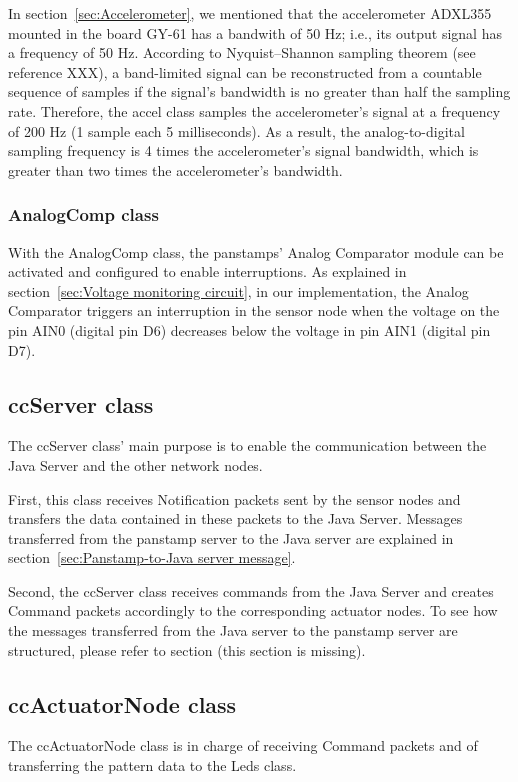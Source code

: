In section~\ref{sec:Accelerometer}, we mentioned that the accelerometer ADXL355 mounted in the board GY-61 has a bandwith of 50 Hz; i.e., its output signal has a frequency of 50 Hz. According to Nyquist–Shannon sampling theorem (see reference XXX), a band-limited signal can be reconstructed from a countable sequence of samples if the signal's bandwidth is no greater than half the sampling rate. Therefore, the accel class samples the accelerometer's signal at a frequency of 200 Hz (1 sample each 5 milliseconds). As a result, the analog-to-digital sampling frequency is 4 times the accelerometer's signal bandwidth, which is greater than two times the accelerometer's bandwidth. 

\subsubsection{AnalogComp class}
With the AnalogComp class, the panstamps' Analog Comparator module can be activated and configured to enable interruptions. As explained in section~\ref{sec:Voltage monitoring circuit}, in our implementation, the Analog Comparator triggers an interruption in the sensor node when the voltage on the pin AIN0 (digital pin D6) decreases below the voltage in pin AIN1 (digital pin D7). 

\subsection{ccServer class}
The ccServer class' main purpose is to enable the communication between the Java Server and the other network nodes. 

First, this class receives Notification packets sent by the sensor nodes and transfers the data contained in these packets to the Java Server. Messages transferred from the panstamp server to the Java server are explained in section~\ref{sec:Panstamp-to-Java server message}. 

Second, the ccServer class receives commands from the Java Server and creates Command packets accordingly to the corresponding actuator nodes. To see how the messages transferred from the Java server to the panstamp server are structured, please refer to section (this section is missing). 

\subsection{ccActuatorNode class}	
The ccActuatorNode class is in charge of receiving Command packets and of transferring the pattern data to the Leds class.  			

